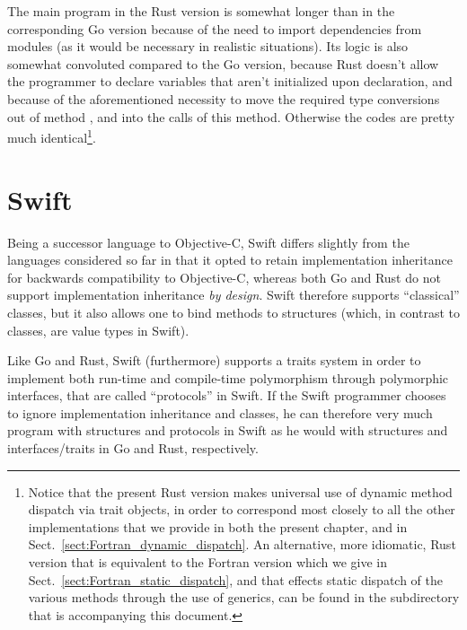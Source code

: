 \documentclass[11pt,oneside]{report}
\newcommand{\code}[1]{{\selectfont\ttfamily{#1}}}
\begin{document}
The main program in the Rust version is somewhat longer than in the
corresponding Go version because of the need to import dependencies
from modules (as it would be necessary in realistic situations). Its
logic is also somewhat convoluted compared to the Go version, because
Rust doesn't allow the programmer to declare variables that aren't
initialized upon declaration, and because of the aforementioned
necessity to move the required type conversions out of method
\code{average}, and into the calls of this method. Otherwise the codes
are pretty much identical\footnote{Notice that the present Rust
version makes universal use of dynamic method dispatch via trait
objects, in order to correspond most closely to all the other
implementations that we provide in both the present chapter, and in
Sect.~\ref{sect:Fortran_dynamic_dispatch}. An alternative, more
idiomatic, Rust version that is equivalent to the Fortran version
which we give in Sect.~\ref{sect:Fortran_static_dispatch}, and that
effects static dispatch of the various \code{sum} methods through the
use of generics, can be found in the \code{Code} subdirectory that is
accompanying this document.}.


\section{Swift}
\label{sect:Swift}

Being a successor language to Objective-C, Swift differs slightly from
the languages considered so far in that it opted to retain
implementation inheritance for backwards compatibility to Objective-C,
whereas both Go and Rust do not support implementation inheritance
\emph{by design}. Swift therefore supports ``classical'' classes, but
it also allows one to bind methods to structures (which, in contrast
to classes, are value types in Swift).

Like Go and Rust, Swift (furthermore) supports a traits system in order
to implement both run-time and compile-time polymorphism through
polymorphic interfaces, that are called ``protocols'' in Swift. If the
Swift programmer chooses to ignore implementation inheritance and
classes, he can therefore very much program with structures and
protocols in Swift as he would with structures and interfaces/traits
in Go and Rust, respectively.
\end{document}
